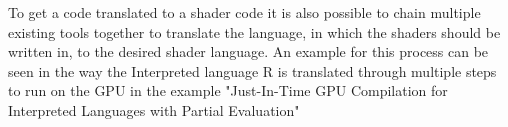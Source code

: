 To get a code translated to a shader code it is also possible to chain multiple existing tools together to translate the language, in which the shaders should be written in, to the desired shader language. An example for this process can be seen in the way the Interpreted language R is translated through multiple steps to run on the GPU in the example "Just-In-Time  GPU  Compilation  for Interpreted  Languages  with  Partial  Evaluation"